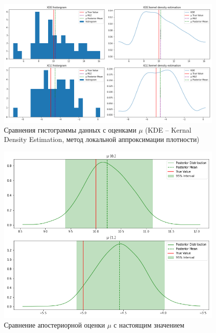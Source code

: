 \documentclass[a4paper,14pt]{extreport}
\begin{document}
\begin{figure}[h!]
	\includegraphics[width=\linewidth]{img/gen/pp_mvn_mu_comparison.png}
	\caption{Сравнения гистограммы данных с оценками $\mu$ (KDE -- Kernal Density Estimation, метод локальной аппроксимации плотности)}
	\label{fig:pp_mvn_mu_comparison}
\end{figure}


\begin{figure}[h!]
	\includegraphics[width=\linewidth]{img/gen/pp_mvn_mu_hdi.png}
	\caption{Сравнение апостериорной оценки $\mu$ с настоящим значением}
	\label{fig:pp_mvn_mu_hdi}
\end{figure}
\end{document}
